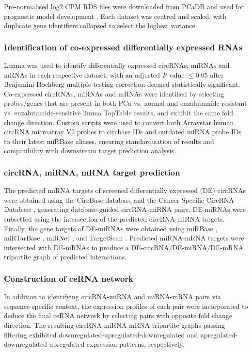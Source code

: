 Pre-normalised log2 CPM RDS files were downloaded from PCaDB and used for prognostic model development \cite{Li2022Jan}. Each dataset was centred and scaled, with duplicate gene identifiers collapsed to select the highest variance.

\subsubsection{Identification of co-expressed differentially expressed RNAs}\label{methods3}
Limma \cite{Ritchie2015} was used to identify differentially expressed circRNAs, miRNAs and mRNAs in each respective dataset, with an adjusted \textit{P} value $\leq$0.05 after Benjamini-Hochberg multiple testing correction deemed statistically significant. Co-expressed circRNAs, miRNAs and mRNAs were identified by selecting probes/genes that are present in both PCa vs. normal and enzalutamide-resistant vs. enzalutamide-sensitive limma TopTable results, and exhibit the same fold change direction. Custom scripts were used to convert both Arraystar human circRNA microarray V2 probes to circbase IDs and outdated miRNA probe IDs to their latest miRBase aliases, ensuring standardisation of results and compatibility with downstream target prediction analysis.

\subsubsection{circRNA, miRNA, mRNA target prediction}\label{methods4}
The predicted miRNA targets of screened differentially expressed (DE) circRNAs were obtained using the CircBase database \cite{circbase} and the Cancer-Specific CircRNA Database \cite{CSCD}, generating database-guided circRNA-miRNA pairs. DE-miRNAs were subsetted using the intersection of the predicted circRNA-miRNA targets. Finally, the gene targets of DE-miRNAs were obtained using miRBase \cite{mirbase}, miRTarBase \cite{mirtarbase}, miRNet \cite{mirnet}, and TargetScan \cite{Targetscan}. Predicted miRNA-mRNA targets were intersected with DE-mRNAs to produce a DE-circRNA/DE-miRNA/DE-mRNA tripartite graph of predicted interactions.

\subsubsection{Construction of ceRNA network}\label{methods5}
In addition to identifying circRNA-miRNA and miRNA-mRNA pairs via sequence-specific context, the expression profiles of each pair were incorporated to deduce the final ceRNA network by selecting pairs with opposite fold change direction. The resulting circRNA-miRNA-mRNA tripartite graphs passing filtering exhibited downregulated-upregulated-downregulated and upregulated-downregulated-upregulated expression patterns, respectively.


